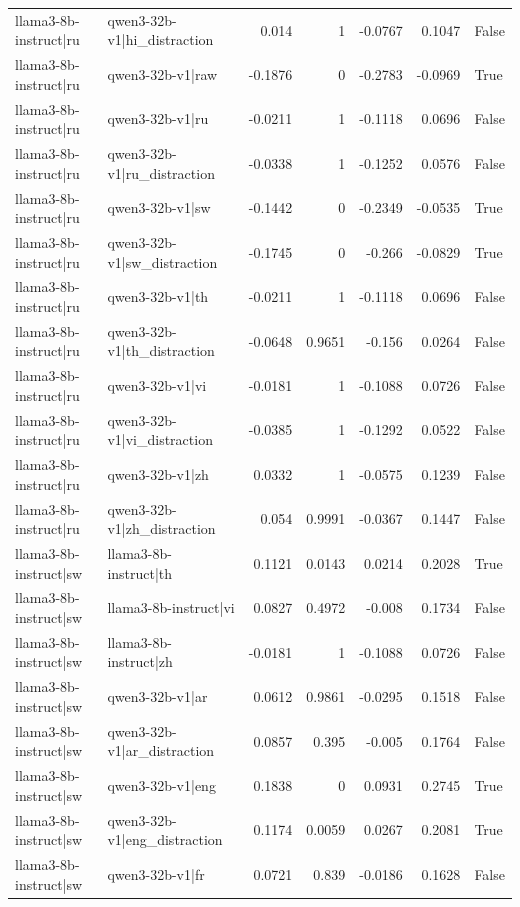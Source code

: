 \begin{table}
\begin{tabular}{l l r r r r l}
llama3-8b-instruct|ru & qwen3-32b-v1|hi_distraction & 0.014 & 1 & -0.0767 & 0.1047 & False \\
llama3-8b-instruct|ru & qwen3-32b-v1|raw & -0.1876 & 0 & -0.2783 & -0.0969 & True \\
llama3-8b-instruct|ru & qwen3-32b-v1|ru & -0.0211 & 1 & -0.1118 & 0.0696 & False \\
llama3-8b-instruct|ru & qwen3-32b-v1|ru_distraction & -0.0338 & 1 & -0.1252 & 0.0576 & False \\
llama3-8b-instruct|ru & qwen3-32b-v1|sw & -0.1442 & 0 & -0.2349 & -0.0535 & True \\
llama3-8b-instruct|ru & qwen3-32b-v1|sw_distraction & -0.1745 & 0 & -0.266 & -0.0829 & True \\
llama3-8b-instruct|ru & qwen3-32b-v1|th & -0.0211 & 1 & -0.1118 & 0.0696 & False \\
llama3-8b-instruct|ru & qwen3-32b-v1|th_distraction & -0.0648 & 0.9651 & -0.156 & 0.0264 & False \\
llama3-8b-instruct|ru & qwen3-32b-v1|vi & -0.0181 & 1 & -0.1088 & 0.0726 & False \\
llama3-8b-instruct|ru & qwen3-32b-v1|vi_distraction & -0.0385 & 1 & -0.1292 & 0.0522 & False \\
llama3-8b-instruct|ru & qwen3-32b-v1|zh & 0.0332 & 1 & -0.0575 & 0.1239 & False \\
llama3-8b-instruct|ru & qwen3-32b-v1|zh_distraction & 0.054 & 0.9991 & -0.0367 & 0.1447 & False \\
llama3-8b-instruct|sw & llama3-8b-instruct|th & 0.1121 & 0.0143 & 0.0214 & 0.2028 & True \\
llama3-8b-instruct|sw & llama3-8b-instruct|vi & 0.0827 & 0.4972 & -0.008 & 0.1734 & False \\
llama3-8b-instruct|sw & llama3-8b-instruct|zh & -0.0181 & 1 & -0.1088 & 0.0726 & False \\
llama3-8b-instruct|sw & qwen3-32b-v1|ar & 0.0612 & 0.9861 & -0.0295 & 0.1518 & False \\
llama3-8b-instruct|sw & qwen3-32b-v1|ar_distraction & 0.0857 & 0.395 & -0.005 & 0.1764 & False \\
llama3-8b-instruct|sw & qwen3-32b-v1|eng & 0.1838 & 0 & 0.0931 & 0.2745 & True \\
llama3-8b-instruct|sw & qwen3-32b-v1|eng_distraction & 0.1174 & 0.0059 & 0.0267 & 0.2081 & True \\
llama3-8b-instruct|sw & qwen3-32b-v1|fr & 0.0721 & 0.839 & -0.0186 & 0.1628 & False \\

\end{tabular}
\end{table}

